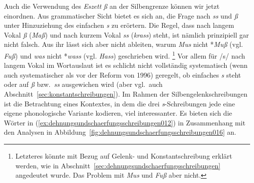 Auch die Verwendung des \textit{Eszett} \textit{ß} an der Silbengrenze können wir jetzt einordnen.
Aus grammatischer Sicht bietet es sich an, die Frage nach \textit{ss} und \textit{ß} unter Hinzuziehung des einfachen \textit{s} zu erörtern.
Die Regel, dass nach langem Vokal \textit{ß} (\textit{Maß}) und nach kurzem Vokal \textit{ss} (\textit{krass}) steht, ist nämlich prinzipiell gar nicht falsch.
Aus ihr lässt sich aber nicht ableiten, warum \zB \textit{Mus} nicht *\textit{Muß} (vgl. \textit{Fuß}) und \textit{was} nicht *\textit{wass} (vgl. \textit{Hass}) geschrieben wird.%
\footnote{Letzteres könnte mit Bezug auf Gelenk- und Konstantschreibung erklärt werden, wie in Abschnitt~\ref{sec:dehnungsundschaerfungsschreibungen} angedeutet wurde.
Das Problem mit \textit{Mus} und \textit{Fuß} aber nicht.}
Vor allem für /s/ nach langem Vokal im Wortauslaut ist es schlicht nicht vollständig systematisch (wenn auch systematischer als vor der Reform von 1996) geregelt, ob einfaches \textit{s} steht oder auf \textit{ß} bzw.\ \textit{ss} ausgewichen wird (aber vgl.\ auch Abschnitt~\ref{sec:konstantschreibungen}).
Im Rahmen der Silbengelenkschreibungen ist die Betrachtung eines Kontextes, in dem die drei \textit{s}-Schreibungen jede eine eigene phonologische Variante kodieren, viel interessanter.
Es bieten sich die Wörter in (\ref{ex:dehnungsundschaerfungsschreibungen012}) in Zusammenhang mit den Analysen in Abbildung~\ref{fig:dehnungsundschaerfungsschreibungen016} an.

\Np

\begin{exe}
  \ex\label{ex:dehnungsundschaerfungsschreibungen012}
  \begin{xlist}
  \end{xlist}
\end{exe}

